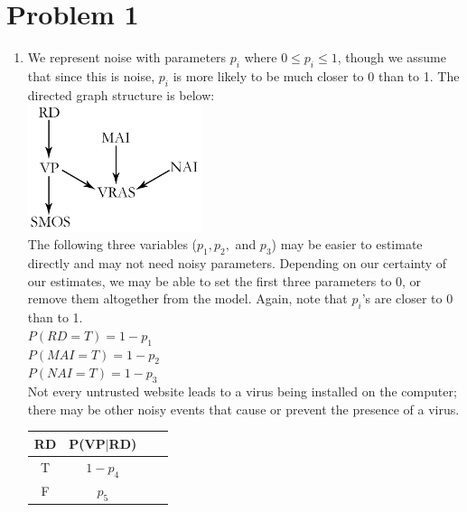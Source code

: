 \documentclass[12pt,letterpaper]{article}
\begin{document}
\thispagestyle{fancy}\small
  \section*{Problem 1}
        \begin{enumerate}[label={(\alph*) }]
        \item 
We represent noise with parameters $p_i$ where $0 \leq p_i \leq 1$, though we assume that since this is noise, $p_i$ is more likely to be much closer to 0 than to 1. The directed graph structure is below:\ \medskip \\
\includegraphics[width=2in]{1a.png}
\medskip\\
 The following  three variables ($p_1, p_2,$ and  $p_3$) may be easier to estimate directly and may not need noisy parameters. Depending on our certainty of our estimates, we may be able to set the first three parameters to 0, or remove them altogether from the model. Again, note that $p_i$'s are closer to 0 than to 1.\medskip \\
$P(RD = T) = 1 - p_1$ \\
$P(MAI = T) = 1 - p_2$ \\
$P(NAI = T) = 1 - p_3$ \medskip \\
Not every untrusted website leads to a virus being installed on the computer; there may be other noisy events that cause or prevent the presence of a virus.  \\

\begin{minipage}{0.3\textwidth}
        \begin{tabular}{c c c c} %
        \hline\hline                        %
         RD & P(VP$|$RD) \\ [0.5ex] 
        \hline                  %
        T & $1-p_4$  \\ %
        F & $p_5$  \\[.5ex]      
        \hline 
        \end{tabular}

        \end{minipage}\qquad \\ \medskip


\end{enumerate}
\end{document}
